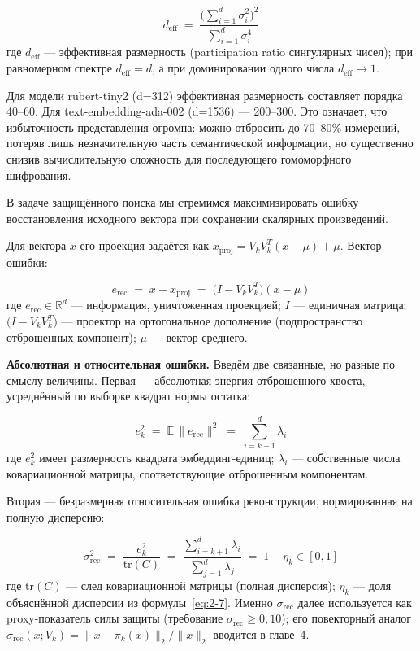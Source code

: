\documentclass[a4paper, 12pt, oneside, openany]{article}
\begin{document}
\begin{equation}
	d_{\mathrm{eff}} \;=\; \frac{\bigl( \sum_{i = 1}^{d} \sigma_{i}^{2} \bigr)^{2}}{\sum_{i = 1}^{d} \sigma_{i}^{4}}
	\label{eq:2-8}
\end{equation}
где $d_{\mathrm{eff}}$ --- эффективная размерность (participation ratio сингулярных чисел); при равномерном спектре $d_{\mathrm{eff}} = d$, а при доминировании одного числа $d_{\mathrm{eff}} \to 1$.

Для модели rubert-tiny2 (d=312) эффективная размерность составляет порядка 40--60. Для text-embedding-ada-002 (d=1536) --- 200--300. Это означает, что избыточность представления огромна: можно отбросить до 70--80\% измерений, потеряв лишь незначительную часть семантической информации, но существенно снизив вычислительную сложность для последующего гомоморфного шифрования.

В задаче защищённого поиска мы стремимся максимизировать ошибку восстановления исходного вектора при сохранении скалярных произведений.

Для вектора \(x\) его проекция задаётся как \(x_{\mathrm{proj}} = V_{k}V_{k}^{T}(x - \mu) + \mu\). Вектор ошибки:

\begin{equation}
	e_{\mathrm{rec}} \;=\; x - x_{\mathrm{proj}} \;=\; \bigl( I - V_{k} V_{k}^{T} \bigr)(x - \mu)
	\label{eq:2-9}
\end{equation}
где $e_{\mathrm{rec}} \in \mathbb{R}^{d}$ --- информация, уничтоженная проекцией; $I$ --- единичная матрица; $\bigl( I - V_{k} V_{k}^{T} \bigr)$ --- проектор на ортогональное дополнение (подпространство отброшенных компонент); $\mu$ --- вектор среднего.

\textbf{Абсолютная и относительная ошибки.} Введём две связанные, но разные по смыслу величины. Первая --- абсолютная энергия отброшенного хвоста, усреднённый по выборке квадрат нормы остатка:

\begin{equation}
	e_{k}^{2} \;=\; \mathbb{E}\,\| e_{\mathrm{rec}} \|^{2} \;=\; \sum_{i = k + 1}^{d} \lambda_{i}
	\label{eq:2-10}
\end{equation}
где $e_{k}^{2}$ имеет размерность квадрата эмбеддинг-единиц; $\lambda_{i}$ --- собственные числа ковариационной матрицы, соответствующие отброшенным компонентам.

Вторая --- безразмерная относительная ошибка реконструкции, нормированная на полную дисперсию:

\begin{equation}
	\sigma_{\mathrm{rec}}^{2} \;=\; \frac{e_{k}^{2}}{\mathrm{tr}(C)} \;=\; \frac{\sum_{i = k + 1}^{d} \lambda_{i}}{\sum_{j = 1}^{d} \lambda_{j}} \;=\; 1 - \eta_{k} \in [0, 1]
	\label{eq:2-11}
\end{equation}
где $\mathrm{tr}(C)$ --- след ковариационной матрицы (полная дисперсия); $\eta_{k}$ --- доля объяснённой дисперсии из формулы~\eqref{eq:2-7}. Именно $\sigma_{\mathrm{rec}}$ далее используется как proxy-показатель силы защиты (требование $\sigma_{\mathrm{rec}} \geq 0{,}10$); его повекторный аналог $\sigma_{\mathrm{rec}}(x; V_{k}) = \|x - \pi_{k}(x)\|_{2} / \|x\|_{2}$ вводится в главе~4.
\end{document}
